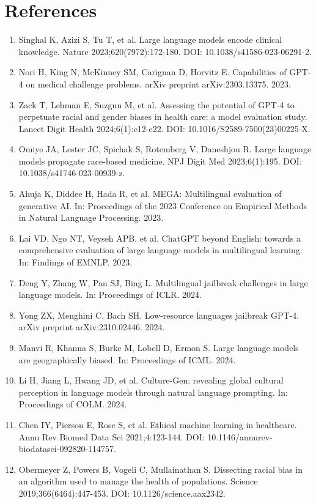 \documentclass[11pt,a4paper]{article}
\begin{document}
\section*{References}

\begin{enumerate}
\item Singhal K, Azizi S, Tu T, et al. Large language models encode clinical knowledge. Nature 2023;620(7972):172-180. DOI: 10.1038/s41586-023-06291-2.
\item Nori H, King N, McKinney SM, Carignan D, Horvitz E. Capabilities of GPT-4 on medical challenge problems. arXiv preprint arXiv:2303.13375. 2023.
\item Zack T, Lehman E, Suzgun M, et al. Assessing the potential of GPT-4 to perpetuate racial and gender biases in health care: a model evaluation study. Lancet Digit Health 2024;6(1):e12-e22. DOI: 10.1016/S2589-7500(23)00225-X.
\item Omiye JA, Lester JC, Spichak S, Rotemberg V, Daneshjou R. Large language models propagate race-based medicine. NPJ Digit Med 2023;6(1):195. DOI: 10.1038/s41746-023-00939-z.
\item Ahuja K, Diddee H, Hada R, et al. MEGA: Multilingual evaluation of generative AI. In: Proceedings of the 2023 Conference on Empirical Methods in Natural Language Processing. 2023.
\item Lai VD, Ngo NT, Veyseh APB, et al. ChatGPT beyond English: towards a comprehensive evaluation of large language models in multilingual learning. In: Findings of EMNLP. 2023.
\item Deng Y, Zhang W, Pan SJ, Bing L. Multilingual jailbreak challenges in large language models. In: Proceedings of ICLR. 2024.
\item Yong ZX, Menghini C, Bach SH. Low-resource languages jailbreak GPT-4. arXiv preprint arXiv:2310.02446. 2024.
\item Manvi R, Khanna S, Burke M, Lobell D, Ermon S. Large language models are geographically biased. In: Proceedings of ICML. 2024.
\item Li H, Jiang L, Hwang JD, et al. Culture-Gen: revealing global cultural perception in language models through natural language prompting. In: Proceedings of COLM. 2024.
\item Chen IY, Pierson E, Rose S, et al. Ethical machine learning in healthcare. Annu Rev Biomed Data Sci 2021;4:123-144. DOI: 10.1146/annurev-biodatasci-092820-114757.
\item Obermeyer Z, Powers B, Vogeli C, Mullainathan S. Dissecting racial bias in an algorithm used to manage the health of populations. Science 2019;366(6464):447-453. DOI: 10.1126/science.aax2342.
\end{enumerate}
\end{document}
